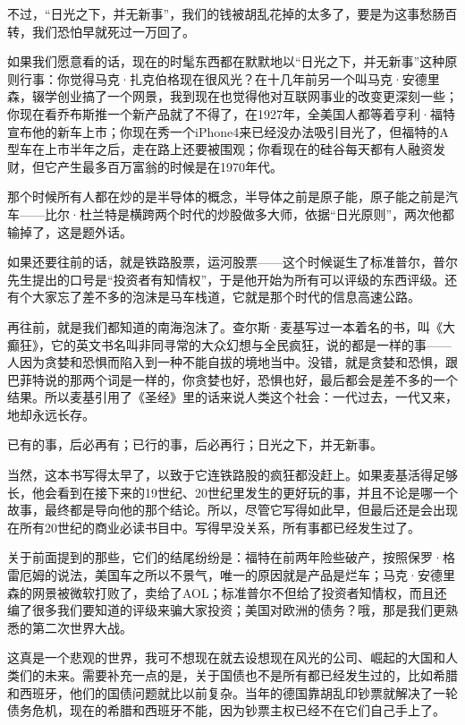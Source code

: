 不过，``日光之下，并无新事''，我们的钱被胡乱花掉的太多了，要是为这事愁肠百转，我们恐怕早就死过一万回了。

如果我们愿意看的话，现在的时髦东西都在默默地以``日光之下，并无新事''这种原则行事：你觉得马克·扎克伯格现在很风光？在十几年前另一个叫马克·安德里森，辍学创业搞了一个网景，我到现在也觉得他对互联网事业的改变更深刻一些；你现在看乔布斯推一个新产品就了不得了，在1927年，全美国人都等着亨利·福特宣布他的新车上市；你现在秀一个iPhone4来已经没办法吸引目光了，但福特的A型车在上市半年之后，走在路上还要被围观；你看现在的硅谷每天都有人融资发财，但它产生最多百万富翁的时候是在1970年代。

那个时候所有人都在炒的是半导体的概念，半导体之前是原子能，原子能之前是汽车------比尔·杜兰特是横跨两个时代的炒股做多大师，依据``日光原则''，两次他都输掉了，这是题外话。

如果还要往前的话，就是铁路股票，运河股票------这个时候诞生了标准普尔，普尔先生提出的口号是``投资者有知情权''，于是他开始为所有可以评级的东西评级。还有个大家忘了差不多的泡沫是马车栈道，它就是那个时代的信息高速公路。

再往前，就是我们都知道的南海泡沫了。查尔斯·麦基写过一本着名的书，叫《大癫狂》，它的英文书名叫非同寻常的大众幻想与全民疯狂，说的都是一样的事------人因为贪婪和恐惧而陷入到一种不能自拔的境地当中。没错，就是贪婪和恐惧，跟巴菲特说的那两个词是一样的，你贪婪也好，恐惧也好，最后都会是差不多的一个结果。所以麦基引用了《圣经》里的话来说人类这个社会：一代过去，一代又来，地却永远长存。

已有的事，后必再有；已行的事，后必再行；日光之下，并无新事。

当然，这本书写得太早了，以致于它连铁路股的疯狂都没赶上。如果麦基活得足够长，他会看到在接下来的19世纪、20世纪里发生的更好玩的事，并且不论是哪一个故事，最终都是导向他的那个结论。所以，尽管它写得如此早，但最后还是会出现在所有20世纪的商业必读书目中。写得早没关系，所有事都已经发生过了。

关于前面提到的那些，它们的结尾纷纷是：福特在前两年险些破产，按照保罗·格雷厄姆的说法，美国车之所以不景气，唯一的原因就是产品是烂车；马克·安德里森的网景被微软打败了，卖给了AOL；标准普尔不但给了投资者知情权，而且还编了很多我们要知道的评级来骗大家投资；美国对欧洲的债务？哦，那是我们更熟悉的第二次世界大战。

这真是一个悲观的世界，我可不想现在就去设想现在风光的公司、崛起的大国和人类们的未来。需要补充一点的是，关于国债也不是所有都已经发生过的，比如希腊和西班牙，他们的国债问题就比以前复杂。当年的德国靠胡乱印钞票就解决了一轮债务危机，现在的希腊和西班牙不能，因为钞票主权已经不在它们自己手上了。

